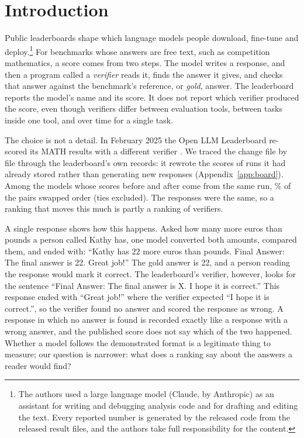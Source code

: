 \section{Introduction}
\label{sec:intro}

Public leaderboards shape which language models people download, fine-tune and
deploy.\ifarxiv\else\footnote{The authors used a large language model (Claude, by Anthropic) as an assistant for
writing and debugging analysis code and for drafting and editing the text. Every reported number is
generated by the released code from the released result files, and the authors take full
responsibility for the content.}\fi{} For benchmarks whose answers are free text, such as competition
mathematics, a score comes from two steps. The model writes a response, and then a program called a
\emph{verifier} reads it, finds the answer it gives, and checks that answer against the benchmark's
reference, or \emph{gold}, answer. The leaderboard reports the model's name and its score. It does
not report which verifier produced the score, even though verifiers differ between evaluation tools,
between tasks inside one tool, and over time for a single task.

The choice is not a detail. In February 2025 the Open LLM Leaderboard re-scored its MATH results with
a different verifier \citep{kydlicek2025fixing}. We traced the change file by file through the
leaderboard's own records: it rewrote the scores of runs it had already stored rather than generating
new responses (Appendix~\ref{app:board}). Among the \BoardShiftModels{} models whose scores before and
after come from the same run, \BoardShiftDiscordantPct\% of the pairs swapped order (ties excluded).
The responses were the same, so a ranking that moves this much is partly a ranking of verifiers.

A single response shows how this happens. Asked how many more euros than pounds a person called
Kathy has, one model converted both amounts, compared them, and ended with: ``Kathy has
$\boxed{22}$ more euros than pounds. Final Answer: The final answer is 22. Great job!'' The gold
answer is 22, and a person reading the response would mark it correct. The leaderboard's verifier,
however, looks for the sentence ``Final Answer: The final answer is X. I hope it is correct.'' This
response ended with ``Great job!'' where the verifier expected ``I hope it is correct.'', so the
verifier found no answer and scored the response as wrong. A response in which no answer is found
is recorded exactly like a response with a wrong answer, and the published score does not say which
of the two happened. Whether a model follows the demonstrated format is a legitimate thing to
measure; our question is narrower: what does a ranking say about the answers a reader would find?

